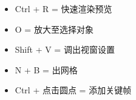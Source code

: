 \documentclass[UTF8]{ctexart}
\begin{document}
\begin{itemize}
    \item Ctrl + R = 快速渲染预览
    \item O = 放大至选择对象
    \item Shift + V = 调出视窗设置
    \item N + B = 出网格
    \item Ctrl + 点击圆点 = 添加关键帧
\end{itemize}
\end{document}
